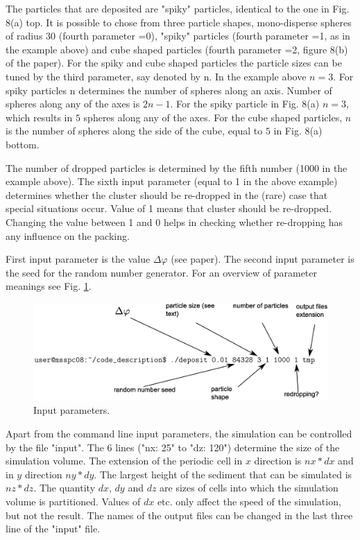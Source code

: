 \documentclass[12pt]{article}
\begin{document}
The particles that are deposited are "spiky" particles, identical to the one in Fig. 8(a) top. It is possible to chose from three particle shapes, mono-disperse spheres of radius 30 (fourth parameter =0), "spiky" particles (fourth parameter =1, as in the example above) and cube shaped particles (fourth parameter =2, figure 8(b) of the paper). For the spiky and cube shaped particles the particle sizes can be tuned by the third parameter, say denoted by n. In the example above $n=3$. For spiky particles n determines the number of spheres along an axis. Number of spheres along any of the axes is $2n-1$.  For the spiky particle in Fig. 8(a) $n=3$, which results in $5$ spheres along any of the axes. For the cube shaped particles, $n$ is the number of spheres along the side of the cube, equal to $5$ in Fig. 8(a) bottom. 

The number of dropped particles is determined by the fifth number (1000 in the example above). The sixth input parameter (equal to 1 in the above example) determines whether the cluster should be re-dropped in the (rare) case that special situations occur. Value of 1 means that cluster should be re-dropped. Changing the value between 1 and 0 helps in checking whether re-dropping has any influence on the packing.

First input parameter is the value $\Delta\varphi$ (see paper). The second input parameter is the seed for the random number generator. For an overview of parameter meanings see Fig. \ref{parameters}.

\begin{figure}
\includegraphics*[width=\columnwidth]{parameters.eps}
\caption{Input parameters.}
\label{parameters}
\end{figure}

Apart from the command line input parameters, the simulation can be controlled by the file "input". The 6 lines ("nx: 25" to "dz: 120") determine the size of the simulation volume. The extension of the periodic cell in $x$ direction is $nx*dx$ and in $y$ direction $ny*dy$. The largest height of the sediment that can be simulated is $nz*dz$. The quantity $dx$, $dy$ and $dz$ are sizes of cells into which the simulation volume is partitioned. Values of $dx$ etc. only affect the speed of the simulation, but not the result. The names of the output files can be changed in the last three line of the "input" file.
\end{document}
